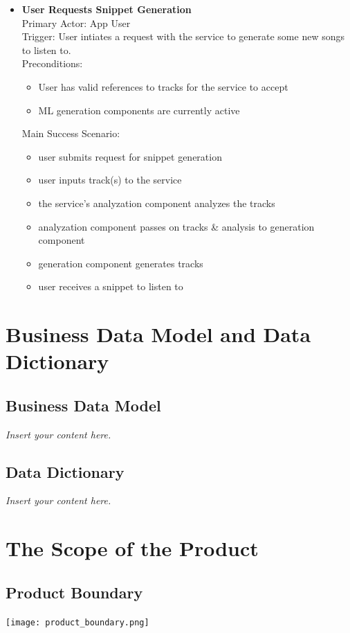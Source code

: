\documentclass[12pt]{article}
\newcommand{\lips}{\textit{Insert your content here.}}
\begin{document}
\begin{itemize}
  \item \textbf{User Requests Snippet Generation}
    \\Primary Actor: App User
    \\Trigger: User intiates a request with the service to generate some new songs to listen to. 
    \\Preconditions: 
    \begin{itemize}
    \item User has valid references to tracks for the service to accept
    \item ML generation components are currently active
    \end{itemize}

    Main Success Scenario: 
    \begin{itemize}
    \item user submits request for snippet generation
    \item user inputs track(s) to the service
    \item the service's analyzation component analyzes the tracks
    \item analyzation component passes on tracks \& analysis to generation component
    \item generation component generates tracks
    \item user receives a snippet to listen to
    \end{itemize}
\end{itemize}



\section{Business Data Model and Data Dictionary}
\subsection{Business Data Model}
\lips
\subsection{Data Dictionary}
\lips

\section{The Scope of the Product}
\subsection{Product Boundary}
\texttt{[image: product\_boundary.png]} \\
\end{document}
